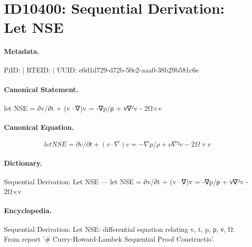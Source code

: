 \section*{ID10400: Sequential Derivation: Let NSE}
\paragraph{Metadata.}
PiID:  | RTEID:  | UUID: e0d1d729-d72b-50c2-aaa0-38b29b581c6e

\paragraph{Canonical Statement.}
let NSE = ∂v/∂t + (v·∇)v = -∇p/ρ + ν∇²v - 2Ω×v

\paragraph{Canonical Equation.}
\[
let NSE = ∂v/∂t + (v·∇)v = -∇p/ρ + ν∇²v - 2Ω×v
\]

\paragraph{Dictionary.}
Sequential Derivation: Let NSE — let NSE = ∂v/∂t + (v·∇)v = -∇p/ρ + ν∇²v - 2Ω×v

\paragraph{Encyclopedia.}
Sequential Derivation: Let NSE: differential equation relating v, t, p, ρ, ν, Ω. From report '\# Curry-Howard-Lambek Sequential Proof Constructio'.

